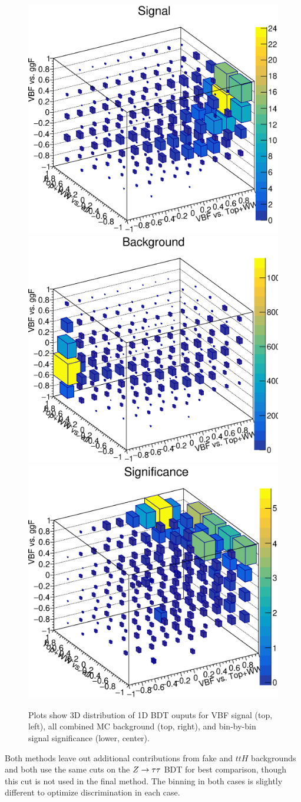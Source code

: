 \begin{figure}[!htbp]
\centering
\includegraphics[width=.4\linewidth]{Pictures/finalBDT_def/Signalfull_1D_simp.eps} \quad
\includegraphics[width=.4\linewidth]{Pictures/finalBDT_def/Backgroundfull_1D_simp.eps}
\medskip
\includegraphics[width=.4\linewidth]{Pictures/finalBDT_def/Significancefull_1D_simp.eps} \quad
\caption{Plots show 3D distribution of 1D BDT ouputs for VBF signal (top, left), all combined MC background (top, right), and bin-by-bin signal significance (lower, center).}
\label{fig:1Das3D}
\end{figure}

Both methods leave out additional contributions from fake and $ttH$ backgrounds and both use the same cuts on the $Z\rightarrow\tau\tau$ BDT for best comparison, though this cut is not used in the final method. The binning in both cases is slightly different to optimize discrimination in each case. 

